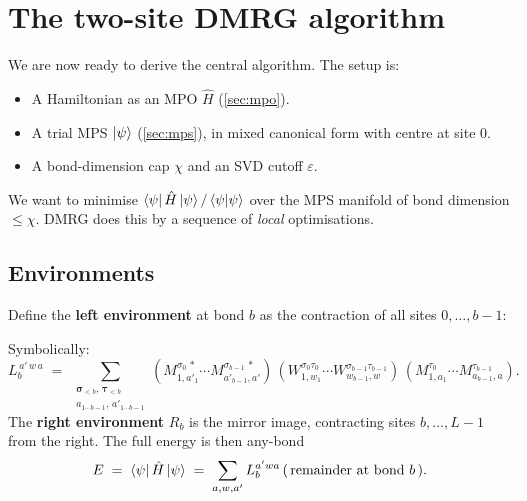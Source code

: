 \documentclass[11pt,a4paper]{article}
\theoremstyle{plain}
\theoremstyle{definition}
\theoremstyle{remark}
\renewcommand{\op}[1]{\hat{#1}}
\newcommand{\eps}{\varepsilon}
\begin{document}
\section{The two-site DMRG algorithm}
\label{sec:dmrg-engine}

We are now ready to derive the central algorithm.  The setup is:

\begin{itemize}[leftmargin=2em]
\item A Hamiltonian as an MPO $\op H$ (\cref{sec:mpo}).
\item A trial MPS $\ket{\psi}$ (\cref{sec:mps}), in mixed canonical form
      with centre at site $0$.
\item A bond-dimension cap $\chi$ and an SVD cutoff $\eps$.
\end{itemize}

We want to minimise $\bra{\psi}\op H\ket{\psi} / \braket{\psi}{\psi}$ over the
MPS manifold of bond dimension $\le \chi$.  DMRG does this by a sequence of
\emph{local} optimisations.

\subsection{Environments}

Define the \textbf{left environment} at bond $b$ as the contraction of all
sites $0,\dots,b-1$:

\begin{center}
\end{center}

Symbolically:
\begin{equation}
  L_b^{\,a'\,w\,a}
  \;=\;
  \!\!\sum_{\substack{\bm\sigma_{<b},\,\bm\tau_{<b}\\ a_{1\cdots b-1},\,a'_{1\cdots b-1}}}
  (M^{\sigma_0\,*}_{1,a'_1}\!\cdots M^{\sigma_{b-1}\,*}_{a'_{b-1},a'})\,
  (W^{\sigma_0\tau_0}_{1,w_1}\!\cdots W^{\sigma_{b-1}\tau_{b-1}}_{w_{b-1},w})\,
  (M^{\tau_0}_{1,a_1}\!\cdots M^{\tau_{b-1}}_{a_{b-1},a}).
\end{equation}
The \textbf{right environment} $R_b$ is the mirror image, contracting sites
$b,\dots,L-1$ from the right.  The full energy is then any-bond
\begin{equation}
  E \;=\; \bra\psi \op H\ket\psi
  \;=\; \sum_{a,w,a'} L_b^{a'wa}\,(\,\text{remainder at bond $b$}\,).
\end{equation}
\end{document}

